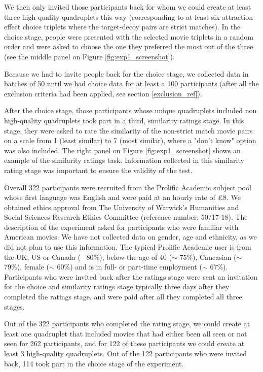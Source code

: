 \documentclass[11pt,a4paper]{article}
\begin{document}
 
  We then only invited those participants back for whom we could create at least three high-quality quadruplets this way (corresponding to at least six attraction effect choice triplets where the target-decoy pairs are strict matches). In the choice stage, people were presented with the selected movie triplets in a random order and were asked to choose the one they preferred the most out of the three (see the middle panel on Figure \ref{fig:exp1_screenshot}). 


Because we had to invite people back for the choice stage, we collected data in batches of 50 until we had choice data for at least a 100 participants (after all the exclusion criteria had been applied, see section \ref{exclusion_ref}). 

 
 After the choice stage, those participants whose unique quadruplets included non high-quality quadruplets took part in a third, similarity ratings stage. In this stage, they were asked to rate the similarity of the non-strict match movie pairs on a scale from 1 (least similar) to 7 (most similar), where a "don't know" option was also included. The right panel on Figure \ref{fig:exp1_screenshot} shows an example of the similarity ratings task. Information collected in this similarity rating stage was important to ensure the validity of the test.
 
 Overall 322 participants were recruited from the Prolific Academic subject pool whose first language was English and were paid at an hourly rate of £8. We obtained ethics approval from The University of Warwick's Humanities and Social Sciences Research Ethics Committee (reference number: 50/17-18). The description of the experiment asked for participants who were familiar with American movies. We have not collected data on gender, age and ethnicity, as we did not plan to use this information. The typical Prolific Academic user is from the UK, US or Canada (~ 80\%), below the age of 40 ($\sim$ 75\%), Caucasian ($\sim$ 79\%), female ($\sim$ 60\%) and is in full- or part-time employment ($\sim$ 67\%). Participants who were invited back after the ratings stage were sent an invitation for the choice and similarity ratings stage typically three days after they completed the ratings stage, and were paid after all they completed all three stages.

Out of the 322 participants who completed the rating stage, we could create at least one quadruplet that included movies that had either been all seen or not seen for 262 participants, and for 122 of these participants we could create at least 3 high-quality quadruplets. Out of the 122 participants who were invited back, 114 took part in the choice stage of the experiment.  
 
\end{document}
